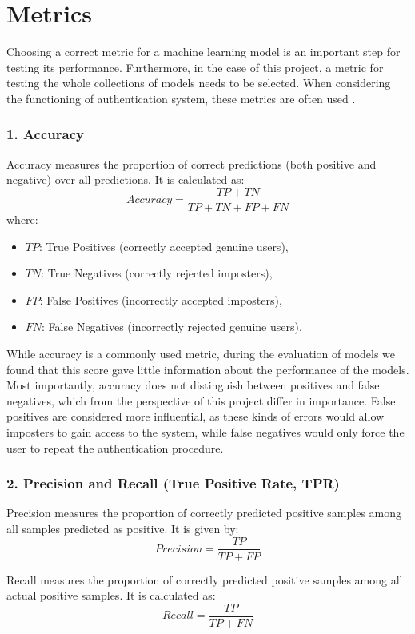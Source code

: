 \section{Metrics}
Choosing a correct metric for a machine learning model is an important step for testing its performance. Furthermore, in the case of this project, a metric for testing the whole collections of models needs to be selected.
When considering the functioning of authentication system, these metrics are often used \cite{traore2011continuous}. 

\subsubsection{1. Accuracy}
Accuracy measures the proportion of correct predictions (both positive and negative) over all predictions. It is calculated as:
\[
Accuracy = \frac{TP + TN}{TP + TN + FP + FN}
\]
where:
\begin{itemize}
	\item $TP$: True Positives (correctly accepted genuine users),
	\item $TN$: True Negatives (correctly rejected imposters),
	\item $FP$: False Positives (incorrectly accepted imposters),
	\item $FN$: False Negatives (incorrectly rejected genuine users).
\end{itemize}

While accuracy is a commonly used metric, during the evaluation of models we found that this score gave little information about the performance of the models. Most importantly, accuracy does not distinguish between positives and false negatives, which from the perspective of this project differ in importance. False positives are considered more influential, as these kinds of errors would allow imposters to gain access to the system, while false negatives would only force the user to repeat the authentication procedure.

\subsubsection{2. Precision and Recall (True Positive Rate, TPR)}
Precision measures the proportion of correctly predicted positive samples among all samples predicted as positive. It is given by:
\[
Precision = \frac{TP}{TP + FP}
\]

Recall measures the proportion of correctly predicted positive samples among all actual positive samples. It is calculated as:
\[
Recall = \frac{TP}{TP + FN}
\]

